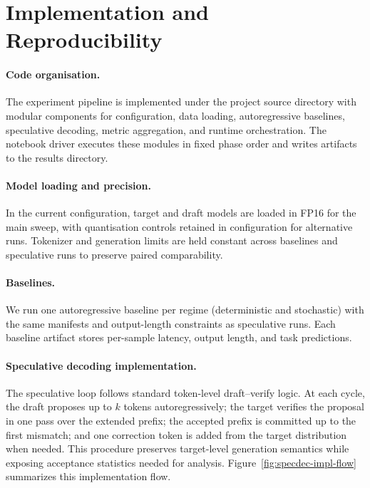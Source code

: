 \section{Implementation and Reproducibility}
\label{sec:impl}

\paragraph{Code organisation.}
The experiment pipeline is implemented under the project source directory with
modular components for configuration, data loading, autoregressive baselines,
speculative decoding, metric aggregation, and runtime orchestration.
The notebook driver executes these modules in fixed phase order and writes
artifacts to the results directory.

\paragraph{Model loading and precision.}
In the current configuration, target and draft models are loaded in FP16 for
the main sweep, with quantisation controls retained in configuration for
alternative runs. Tokenizer and generation limits are held constant across
baselines and speculative runs to preserve paired comparability.

\paragraph{Baselines.}
We run one autoregressive baseline per regime (deterministic and stochastic)
with the same manifests and output-length constraints as speculative runs.
Each baseline artifact stores per-sample latency, output length, and task
predictions.

\paragraph{Speculative decoding implementation.}
The speculative loop follows standard token-level draft--verify logic.
At each cycle, the draft proposes up to $k$ tokens autoregressively; the
target verifies the proposal in one pass over the extended prefix; the accepted
prefix is committed up to the first mismatch; and one correction token is added
from the target distribution when needed. This procedure preserves target-level
generation semantics while exposing acceptance statistics needed for analysis.
Figure~\ref{fig:specdec-impl-flow} summarizes this implementation flow.

